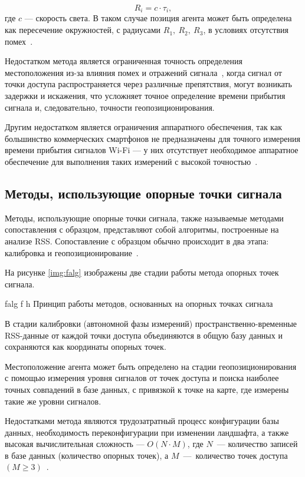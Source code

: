 \begin{equation}
    R_i = c \cdot \tau_i,
    \label{eq:toa-t}
\end{equation}
где $c$ --- скорость света. В таком случае позиция агента может быть определена как пересечение окружностей, с радиусами $R_1,~R_2,~R_3$, в условиях отсутствия помех~\cite{toa}.

Недостатком метода является ограниченная точность определения местоположения из-за влияния помех и отражений сигнала~\cite{toa}, когда сигнал от точки доступа распространяется через различные препятствия, могут возникать задержки и искажения, что усложняет точное определение времени прибытия сигнала и, следовательно, точности геопозиционирования.

Другим недостатком является ограничения аппаратного обеспечения, так как большинство коммерческих смартфонов не предназначены для точного измерения времени прибытия сигналов Wi-Fi --- у них отсутствует необходимое аппаратное обеспечение для выполнения таких измерений с высокой точностью~\cite{urban-info}.

\clearpage

\subsection{Методы, использующие опорные точки сигнала}

Методы, использующие опорные точки сигнала, также называемые методами сопоставления с образцом, представляют собой алгоритмы, построенные на анализе RSS. Сопоставление с образцом обычно происходит в два этапа: калибровка и геопозиционирование~\cite{intro}.

На рисунке \ref{img:falg} изображены две стадии работы метода опорных точек сигнала.

    {falg}
    {f}
    {h}
    {\linewidth}
    {Принцип работы методов, основанных на опорных точках сигнала}

В стадии калибровки (автономной фазы измерений) пространственно-временные RSS-данные от каждой точки доступа объединяются в общую базу данных и сохраняются как координаты опорных точек.

Местоположение агента может быть определено на стадии геопозиционирования с помощью измерения уровня сигналов от точек доступа и поиска наиболее точных совпадений в базе данных, с привязкой к точке на карте, где измерены такие же уровни сигналов.

Недостатками метода являются трудозатратный процесс конфигурации базы данных, необходимость переконфигурации при изменении ландшафта, а также высокая вычислительная сложность --- $O(N\cdot M)$, где $N$~--- количество записей в базе данных (количество опорных точек), а $M$~---~количество точек доступа $(M \geq 3)$~\cite{fingerprint}.

